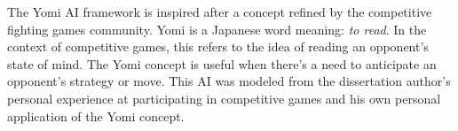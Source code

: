 The Yomi AI framework is inspired after a concept refined by the competitive fighting games community. Yomi is a Japanese word meaning: \textit{to read}. In the context of competitive games, this refers to the idea of reading an opponent's state of mind. The Yomi concept is useful when there's a need to anticipate an opponent's strategy or move. This AI was modeled from the dissertation author's personal experience at participating in competitive games and his own personal application of the Yomi concept.